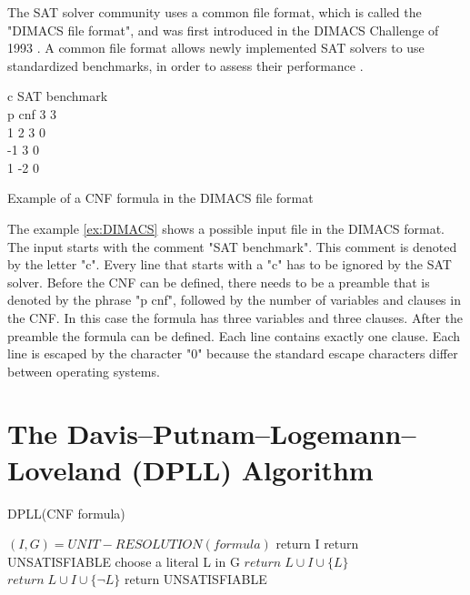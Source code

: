 The SAT solver community uses a common file format, which is called the "DIMACS file format", and was first introduced in the DIMACS Challenge of 1993 \cite{johnson1996cliques}. A common file format allows newly implemented SAT solvers to use standardized benchmarks, in order to assess their performance \cite{biere2009handbook}.

\begin{example}
\begin{leftbar}
\centering
c SAT benchmark\\
p cnf 3 3\\
1 2 3 0\\
-1 3 0\\
1 -2 0
\end{leftbar}
\caption{Example of a CNF formula in the DIMACS file format}
\label{ex:DIMACS}
\end{example}

The example \ref{ex:DIMACS} shows a possible input file in the DIMACS format. The input starts with the comment "SAT benchmark". This comment is denoted by the letter "c". Every line that starts with a "c" has to be ignored by the SAT solver. Before the CNF can be defined, there needs to be a preamble that is denoted by the phrase "p cnf", followed by the number of variables and clauses in the CNF. In this case the formula has three variables and three clauses. After the preamble the formula can be defined. Each line contains exactly one clause. Each line is escaped by the character "0" because the standard escape characters differ between operating systems.

\section{The Davis–Putnam–Logemann–Loveland (DPLL) Algorithm}
\label{sec:dpll}

\begin{algorithm}
\caption{DPLL(CNF formula) \cite{biere2009handbook}}\label{alg:DPLL}
\begin{algorithmic}
\State $(I,G) = UNIT-RESOLUTION(formula)$
	\State return I
    \State return UNSATISFIABLE
\Else
	\State choose a literal L in G
		\State $return \; L \cup I \cup \{L\}$
		\State $return \; L \cup I \cup \{\neg L\}$
	\Else
		\State return UNSATISFIABLE
	\EndIf
\EndIf
\end{algorithmic}
\end{algorithm}


